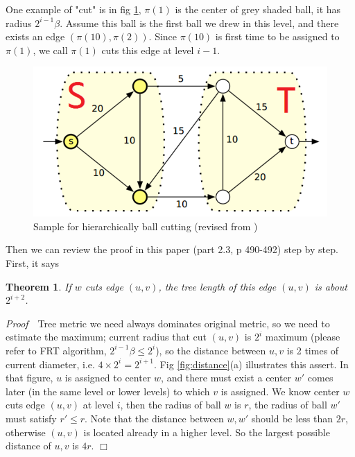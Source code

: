 \documentclass[11pt,twoside, onecolumn]{IEEEtran}
\newtheorem{Theorem}{Theorem}[section]
\begin{document}
One example of "cut" is in fig \ref{fig:cut}, $\pi(1)$ is the center of grey shaded ball, it has radius
$2^{i-1}\beta$. Assume this ball is the first ball we drew in this level, and there exists an edge
$(\pi(10),\pi(2))$. Since $\pi(10)$ is first time to be assigned to $\pi(1)$, we call $\pi(1)$ cuts
this edge at level $i-1$.

\begin{figure}[hbt]
	\begin{center}
	\includegraphics[scale=0.4]{cut.png}
	\end{center}
	\caption{Sample for hierarchically ball cutting (revised from \cite{thispaper})}
	\label{fig:cut}
\end{figure}

Then we can review the proof in this paper (part 2.3, p 490-492) step by step. First, it says 
\begin{Theorem}
If $w$ cuts
edge $(u,v)$, the tree length of this edge $(u,v)$ is about $2^{i+2}$.
\end{Theorem}

{\it Proof}\ \ 
Tree metric we need
always dominates original metric, so we need to estimate the maximum; current radius that cut $(u,v)$ is
$2^i$ maximum (please refer to FRT algorithm, $2^{i-1}\beta \leq 2^i$), so the distance between $u,v$ is
2 times of current diameter, i.e. $4\times 2^{i} = 2^{i+1}$. Fig \ref{fig:distance}(a) illustrates this
assert. 
In that figure, $u$ is assigned to center $w$, and there must exist a center $w'$ comes later (in the same
level or lower levels) to which $v$ is assigned. We know center $w$ cuts edge $(u,v)$ at level $i$,
then the radius of ball $w$ is $r$, the radius of ball $w'$ must satisfy $r'\leq r$. Note that
the distance between $w,w'$ should be less than $2r$, otherwise $(u,v)$ is located already in a higher level.
 So the largest possible distance of $u,v$ is $4r$.
$\Box$
\end{document}
